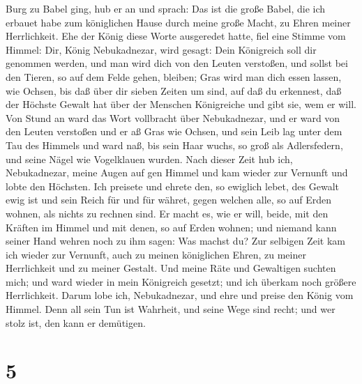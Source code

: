 Burg zu Babel ging,  hub er an und sprach: Das ist die
große Babel, die ich erbauet habe zum königlichen Hause durch meine
große Macht, zu Ehren meiner Herrlichkeit.  Ehe der König
diese Worte ausgeredet hatte, fiel eine Stimme vom Himmel: Dir, König
Nebukadnezar, wird gesagt: Dein Königreich soll dir genommen werden,
 und man wird dich von den Leuten verstoßen, und sollst bei
den Tieren, so auf dem Felde gehen, bleiben; Gras wird man dich essen
lassen, wie Ochsen, bis daß über dir sieben Zeiten um sind, auf daß du
erkennest, daß der Höchste Gewalt hat über der Menschen Königreiche und
gibt sie, wem er will.  Von Stund an ward das Wort
vollbracht über Nebukadnezar, und er ward von den Leuten verstoßen und
er aß Gras wie Ochsen, und sein Leib lag unter dem Tau des Himmels und
ward naß, bis sein Haar wuchs, so groß als Adlersfedern, und seine Nägel
wie Vogelklauen wurden.  Nach dieser Zeit hub ich,
Nebukadnezar, meine Augen auf gen Himmel und kam wieder zur Vernunft und
lobte den Höchsten. Ich preisete und ehrete den, so ewiglich lebet, des
Gewalt ewig ist und sein Reich für und für währet,  gegen
welchen alle, so auf Erden wohnen, als nichts zu rechnen sind. Er macht
es, wie er will, beide, mit den Kräften im Himmel und mit denen, so auf
Erden wohnen; und niemand kann seiner Hand wehren noch zu ihm sagen: Was
machst du?  Zur selbigen Zeit kam ich wieder zur Vernunft,
auch zu meinen königlichen Ehren, zu meiner Herrlichkeit und zu meiner
Gestalt. Und meine Räte und Gewaltigen suchten mich; und ward wieder in
mein Königreich gesetzt; und ich überkam noch größere Herrlichkeit.
 Darum lobe ich, Nebukadnezar, und ehre und preise den
König vom Himmel. Denn all sein Tun ist Wahrheit, und seine Wege sind
recht; und wer stolz ist, den kann er demütigen.

\hypertarget{section-4}{%
\section{5}\label{section-4}}

